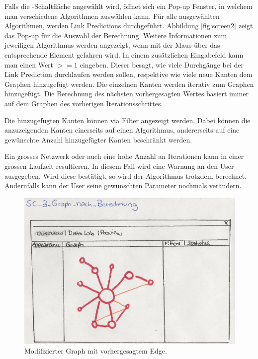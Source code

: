 Falls die -Schaltfläche angewählt wird, öffnet sich ein Pop-up Fenster, in welchem man verschiedene Algorithmen auswählen
kann. Für alle ausgewählten Algorithmen, werden Link Predictions durchgeführt. Abbildung \ref{fig:screen2} zeigt das Pop-up für die Auswahl der Berechnung. Weitere Informationen zum jeweiligen Algorithmus werden angezeigt, wenn mit der Maus über das entsprechende Element gefahren wird. In einem zusätzlichen Eingabefeld kann man einen Wert
$>= 1$ eingeben. Dieser besagt, wie viele Durchgänge bei der Link Prediction durchlaufen werden sollen, respektive wie viele
neue Kanten dem Graphen hinzugefügt werden. Die einzelnen Kanten werden iterativ zum Graphen hinzugefügt. Die Berechnung des nächsten vorhergesagten Wertes basiert immer auf dem Graphen des vorherigen Iterationsschrittes.

Die hinzugefügten Kanten können via Filter angezeigt werden. Dabei können die anzuzeigenden Kanten einerseits auf einen Algorithmus, andererseits auf eine gewünschte Anzahl hinzugefügter Kanten beschränkt werden.


Ein grosses Netzwerk oder auch eine hohe Anzahl an Iterationen kann in einer grossen Laufzeit resultieren.
In diesem Fall wird eine Warnung an den User ausgegeben. Wird diese bestätigt, so wird der Algorithmus trotzdem berechnet. Andernfalls kann der User seine gewünschten
Parameter nochmals verändern.

\begin{figure}
    \includegraphics[width=\linewidth]{resources/SC-3.png}
    \caption{Modifizierter Graph mit vorhergesagtem Edge.}
    \label{fig:screen3}
\end{figure}

